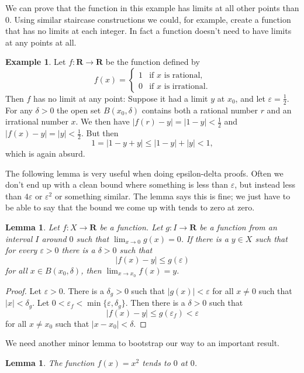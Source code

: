 \documentclass[11pt]{article}
\newtheorem{lemm}[theo]{Lemma}
\theoremstyle{definition}
\newtheorem{exam}[theo]{Example}
\def\eps{\varepsilon}
\def\RR{\mathbf{R}}
\begin{document}
We can prove that the function in this example has limits at all other points
than $0$. Using similar staircase constructions we could, for example, create a
function that has no limits at each integer. In fact a function doesn't need to
have limits at any points at all.


\begin{exam}
Let $f : \RR \to \RR$ be the function defined by
\[
f(x) = \begin{cases}
1 & \text{if $x$ is rational},
\\
0 & \text{if $x$ is irrational}.
\end{cases}
\]
Then $f$ has no limit at any point:
Suppose it had a limit $y$ at $x_0$, and let $\eps = \frac12$.
For any $\delta > 0$ the open set $B(x_0, \delta)$ contains both a
rational number $r$ and an irrational number $x$.
We then have $|f(r) - y| = |1 - y| < \frac12$ and
$|f(x) - y| = |y| < \frac12$.
But then
\[
1 = |1 - y + y|
\leq |1 - y| + |y|
< 1,
\]
which is again absurd.
\end{exam}


The following lemma is very useful when doing epsilon-delta proofs.
Often we don't end up with a clean bound where something is less than
$\eps$, but instead less than $4\eps$ or $\eps^2$ or something similar.
The lemma says this is fine; we just have to be able to say that the bound
we come up with tends to zero at zero.


\begin{lemm}
Let $f : X \to \RR$ be a function.
Let $g : I \to \RR$ be a function from an interval $I$ around $0$ such that
$\lim_{x \to 0} g(x) = 0$.
If there is a $y \in X$ such that for every $\eps > 0$ there is a $\delta > 0$
such that
\[
|f(x) - y| \leq g(\eps)
\]
for all $x \in B(x_0, \delta)$, then $\lim_{x \to x_0} f(x) = y$.
\end{lemm}


\begin{proof}
Let $\eps > 0$.
There is a $\delta_g > 0$ such that $|g(x)| < \eps$ for all $x \not= 0$ such that
$|x| < \delta_g$.
Let $0 < \eps_f < \min\{\eps, \delta_g\}$.
Then there is a $\delta > 0$ such that
\[
|f(x) - y| \leq g(\eps_f) < \eps
\]
for all $x \not= x_0$ such that $|x - x_0| < \delta$.
\end{proof}


We need another minor lemma to bootstrap our way to an important result.


\begin{lemm}
The function $f(x) = x^2$ tends to $0$ at $0$.
\end{lemm}
\end{document}
